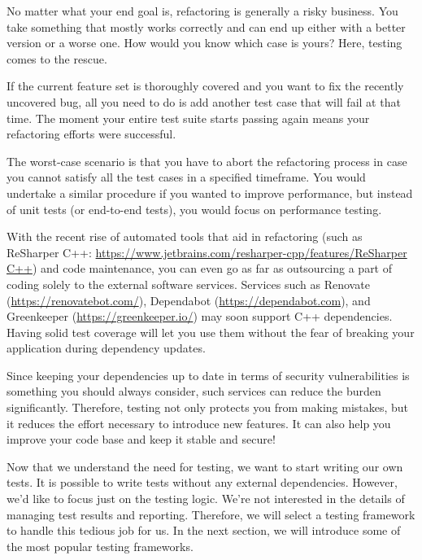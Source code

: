 No matter what your end goal is, refactoring is generally a risky business. You take something that mostly works correctly and can end up either with a better version or a worse one. How would you know which case is yours? Here, testing comes to the rescue.

If the current feature set is thoroughly covered and you want to fix the recently uncovered bug, all you need to do is add another test case that will fail at that time. The moment your entire test suite starts passing again means your refactoring efforts were successful.

The worst-case scenario is that you have to abort the refactoring process in case you cannot satisfy all the test cases in a specified timeframe. You would undertake a similar procedure if you wanted to improve performance, but instead of unit tests (or end-to-end tests), you would focus on performance testing.

With the recent rise of automated tools that aid in refactoring (such as ReSharper C++: \url{https://www.jetbrains.com/resharper-cpp/features/ReSharper C++}) and code maintenance, you can even go as far as outsourcing a part of coding solely to the external software services. Services such as Renovate (\url{https://renovatebot.com/}), Dependabot (\url{https://dependabot.com}), and Greenkeeper (\url{https://greenkeeper.io/}) may soon support C++ dependencies. Having solid test coverage will let you use them without the fear of breaking your application during dependency updates.

Since keeping your dependencies up to date in terms of security vulnerabilities is something you should always consider, such services can reduce the burden significantly. Therefore, testing not only protects you from making mistakes, but it reduces the effort necessary to introduce new features. It can also help you improve your code base and keep it stable and secure!

Now that we understand the need for testing, we want to start writing our own tests. It is possible to write tests without any external dependencies. However, we'd like to focus just on the testing logic. We're not interested in the details of managing test results and reporting. Therefore, we will select a testing framework to handle this tedious job for us. In the next section, we will introduce some of the most popular testing frameworks.















